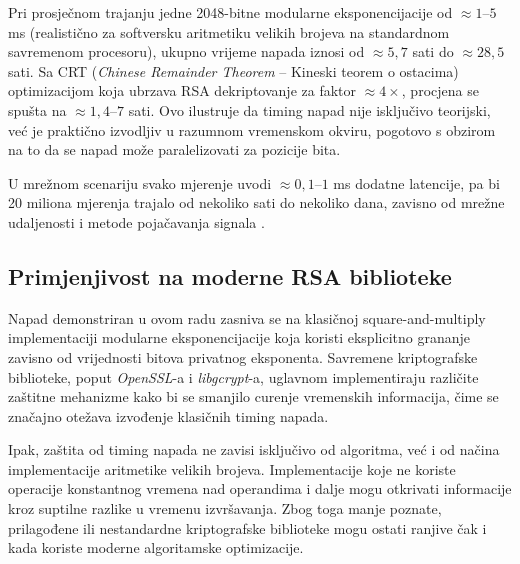 Pri prosječnom trajanju jedne 2048-bitne modularne eksponencijacije od $\approx 1$--$5$ ms (realistično za softversku aritmetiku velikih brojeva na standardnom savremenom procesoru), ukupno vrijeme napada iznosi od $\approx 5{,}7$ sati do $\approx 28{,}5$ sati. Sa CRT (\textit{Chinese Remainder Theorem} -- Kineski teorem o ostacima) optimizacijom koja ubrzava RSA dekriptovanje za faktor $\approx 4\times$, procjena se spušta na $\approx 1{,}4$--$7$ sati. Ovo ilustruje da timing napad nije isključivo teorijski, već je praktično izvodljiv u razumnom vremenskom okviru, pogotovo s obzirom na to da se napad može paralelizovati za pozicije bita.

U mrežnom scenariju svako mjerenje uvodi $\approx 0{,}1$--$1$ ms dodatne latencije, pa bi 20 miliona mjerenja trajalo od nekoliko sati do nekoliko dana, zavisno od mrežne udaljenosti i metode pojačavanja signala \cite{brumley2003}.

\subsection{Primjenjivost na moderne RSA biblioteke}

Napad demonstriran u ovom radu zasniva se na klasičnoj square-and-multiply implementaciji modularne eksponencijacije koja koristi eksplicitno grananje zavisno od vrijednosti bitova privatnog eksponenta. Savremene kriptografske biblioteke, poput \textit{OpenSSL}-a i \textit{libgcrypt}-a, uglavnom implementiraju različite zaštitne mehanizme kako bi se smanjilo curenje vremenskih informacija, čime se značajno otežava izvođenje klasičnih timing napada.

Ipak, zaštita od timing napada ne zavisi isključivo od algoritma, već i od načina implementacije aritmetike velikih brojeva. Implementacije koje ne koriste operacije konstantnog vremena nad operandima i dalje mogu otkrivati informacije kroz suptilne razlike u vremenu izvršavanja. Zbog toga manje poznate, prilagođene ili nestandardne kriptografske biblioteke mogu ostati ranjive čak i kada koriste moderne algoritamske optimizacije.


